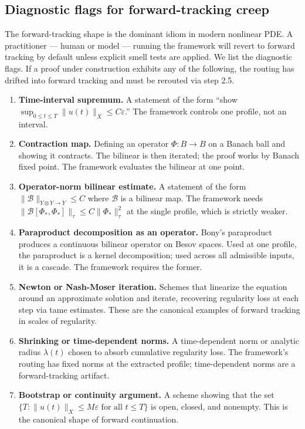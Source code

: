 \documentclass[11pt]{article}
\theoremstyle{plain}
\theoremstyle{definition}
\theoremstyle{remark}
\begin{document}
\subsection{Diagnostic flags for forward-tracking creep}
\label{subsec:diagnostic-flags}

The forward-tracking shape is the dominant idiom in modern nonlinear PDE. A
practitioner — human or model — running the framework will revert to forward
tracking by default unless explicit smell tests are applied. We list the
diagnostic flags. If a proof under construction exhibits any of the following,
the routing has drifted into forward tracking and must be rerouted via
 step 2.5.

\begin{enumerate}
\item \textbf{Time-interval supremum.} A statement of the form ``show
\(\sup_{0 \leq t \leq T} \|u(t)\|_X \leq C\varepsilon\).'' The framework
controls one profile, not an interval.

\item \textbf{Contraction map.} Defining an operator \(\Phi: B \to B\) on a
Banach ball and showing it contracts. The bilinear is then iterated; the proof
works by Banach fixed point. The framework evaluates the bilinear at one
point.

\item \textbf{Operator-norm bilinear estimate.} A statement of the form
\(\|\mathcal{B}\|_{Y \otimes Y \to Y} \leq C\) where \(\mathcal{B}\) is a
bilinear map. The framework needs \(\|\mathcal{B}[\Phi_*, \Phi_*]\|_\tau \leq
C \|\Phi_*\|_\tau^2\) at the single profile, which is strictly weaker.

\item \textbf{Paraproduct decomposition as an operator.} Bony's paraproduct
produces a continuous bilinear operator on Besov spaces. Used at one profile,
the paraproduct is a kernel decomposition; used across all admissible inputs,
it is a cascade. The framework requires the former.

\item \textbf{Newton or Nash-Moser iteration.} Schemes that linearize the
equation around an approximate solution and iterate, recovering regularity loss
at each step via tame estimates. These are the canonical examples of forward
tracking in scales of regularity.

\item \textbf{Shrinking or time-dependent norms.} A
time-dependent norm or analytic radius \(\lambda(t)\) chosen to absorb cumulative
regularity loss. The framework's routing has fixed norms at the
extracted profile; time-dependent norms are a forward-tracking artifact.

\item \textbf{Bootstrap or continuity argument.} A scheme showing that the set
\(\{T : \|u(t)\|_X \leq M\varepsilon \text{ for all } t \leq T\}\) is open,
closed, and nonempty. This is the canonical shape of forward continuation.
\end{enumerate}
\end{document}
